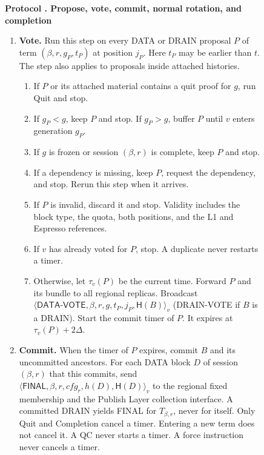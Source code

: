 \documentclass[11pt,a4paper]{article}
\newcommand{\RR}[1]{{\color{rrRed}#1}}
\newcommand{\Hash}{\mathsf H}
\newcommand{\tagg}[1]{\ensuremath{\mathsf{#1}}}
\newcounter{protocol}
\newenvironment{protocol}[3][htbp]{\begin{figure}[#1]\refstepcounter{protocol}\label{#2}
\begin{mdframed}[linewidth=.6pt,skipabove=0pt,skipbelow=0pt,
innertopmargin=7pt,innerbottommargin=7pt]\small
\textbf{Protocol \theprotocol. #3}\par\smallskip}{\end{mdframed}\end{figure}}
\begin{document}
\begin{protocol}{alg:steady}{Propose, vote, commit, normal rotation\RR{, and completion}}
\begin{enumerate}[label=\textbf{\arabic*)},itemsep=3pt]
\item \textbf{Vote.} Run this step on every DATA \RR{or DRAIN} proposal
$P$ of term $(\beta,r,g_P,t_P)$ at position $j_P$. Here $t_P$ may be earlier
than $t$. The step also applies to proposals inside attached histories.
 \begin{enumerate}[label=(\alph*)]
 \item If $P$ or its attached material contains a quit proof for $g$,
       run Quit and stop.
 \item If $g_P<g$, keep $P$ and stop. If $g_P>g$, buffer $P$
       until $v$ enters generation $g_P$.
 \item If $g$ is frozen \RR{or session $(\beta,r)$ is complete}, keep $P$ and
       stop.
 \item If a dependency is missing, keep $P$, request the dependency,
       and stop. Rerun this step when it arrives.
 \item If $P$ is invalid, discard it and stop. \RR{Validity includes the
       block type, the quota, both positions, and the L1 and Espresso references.}
 \item If $v$ has already voted for $P$, stop.
       A duplicate never restarts a timer.
 \item Otherwise, let $\tau_v(P)$ be the current time. Forward $P$ and
       its bundle to all \RR{regional replicas. }
       Broadcast
       $\langle\tagg{DATA\mbox{-}VOTE},\beta,r,g,t_P,j_P,\Hash(B)\rangle_v$
       \RR{(DRAIN-VOTE if $B$ is a DRAIN)}.
       Start the commit timer of $P$. It expires at $\tau_v(P)+2\Delta$.
 \end{enumerate}

\item \textbf{Commit.} When the timer of $P$ expires, commit $B$ and
its uncommitted ancestors. \RR{For each DATA block $D$ of session $(\beta,r)$
that this commits, send
$\langle\tagg{FINAL},\beta,r,\mathit{cfg}_r,h(D),\Hash(D)\rangle_v$ to the regional fixed membership and the Publish Layer collection interface. A committed DRAIN yields FINAL for $T_{\beta,r}$, never for
itself. } Only Quit \RR{and Completion} cancel a timer. Entering a
new term does not cancel it. A QC never starts a timer. \RR{A force
instruction never cancels a timer.}


\end{enumerate}
\end{protocol}
\end{document}
